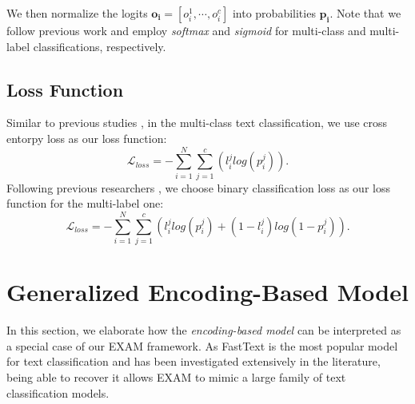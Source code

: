 \documentclass[letterpaper]{article} %
\begin{document}
%
We then normalize the logits $\mathbf{o_i} = [o_i^1, \cdots, o_i^c]$ into probabilities $\mathbf{p_i}$. Note that we follow previous work \cite{fasttext} and employ \textit{softmax} and \textit{sigmoid} for multi-class and multi-label classifications, respectively.
%

\subsection{Loss Function}
Similar to previous studies \cite{vdcnn}, in the multi-class text classification, we use cross entorpy loss as our loss function:
\begin{equation}
\mathcal{L}_{loss} =  -\sum_{i=1}^{N}\sum_{j=1}^{c}(l_{i}^{j}log(p_{i}^{j})). 
\end{equation}
Following previous researchers \cite{fasttext}, we choose binary classification loss as our loss function for the multi-label one:
\begin{equation}
\mathcal{L}_{loss} =  -\sum_{i=1}^{N}\sum_{j=1}^{c}(l_{i}^{j}log(p_{i}^{j})+(1-l_{i}^{j})log(1-p_{i}^{j})). 
\end{equation}

\section{Generalized Encoding-Based Model}
In this section, we elaborate how the \textit{encoding-based model} can be interpreted as a special case of our EXAM framework. As FastText \cite{fasttext} is the most popular model for text classification and has been investigated extensively in the literature, being able to recover it allows EXAM to mimic a large family of text classification models.%
\end{document}
